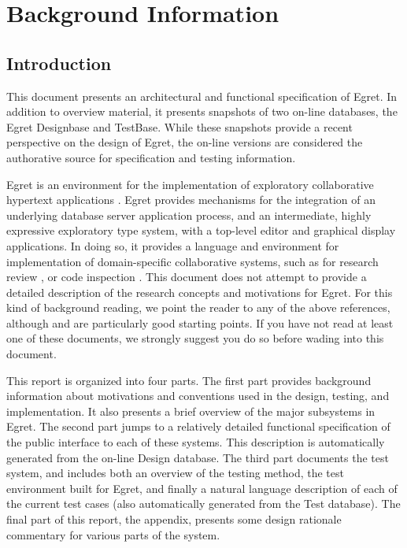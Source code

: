 \chapter{Background Information}
\section{Introduction}

This document presents an architectural and functional specification
of Egret. In addition to overview material, it presents snapshots of
two on-line databases, the Egret Designbase and TestBase.  While these
snapshots provide a recent perspective on the design of Egret, the
on-line versions are considered the authorative source for
specification and testing information.

Egret is an environment for the implementation of exploratory collaborative
hypertext applications \cite{csdl-91-03,csdl-92-01}.  Egret provides
mechanisms for the integration of an underlying database server
application process, and an intermediate, highly expressive
exploratory type system, with a top-level editor and graphical display
applications.  In doing so, it provides a language and environment for
implementation of domain-specific collaborative systems, such as for
research review \cite{csdl-92-03,csdl-92-05}, or code inspection
\cite{csdl-92-04}.  This document does not attempt to provide a
detailed description of the research concepts and motivations for
Egret. For this kind of background reading, we point the reader to any
of the above references, although \cite{csdl-92-01} and
\cite{csdl-92-03} are particularly good starting points.  If you have
not read at least one of these documents, we strongly suggest you do
so before wading into this document.

This report is organized into four parts.  The first part provides
background information about motivations and conventions used in the
design, testing, and implementation.  It also presents a brief
overview of the major subsystems in Egret.  The second part jumps to a
relatively detailed functional specification of the public interface
to each of these systems.  This description is automatically generated
from the on-line Design database.  The third part documents the test
system, and includes both an overview of the testing method, the test
environment built for Egret, and finally a natural language
description of each of the current test cases (also automatically
generated from the Test database).  The final part of this report, the
appendix, presents some design rationale commentary for various parts
of the system.


